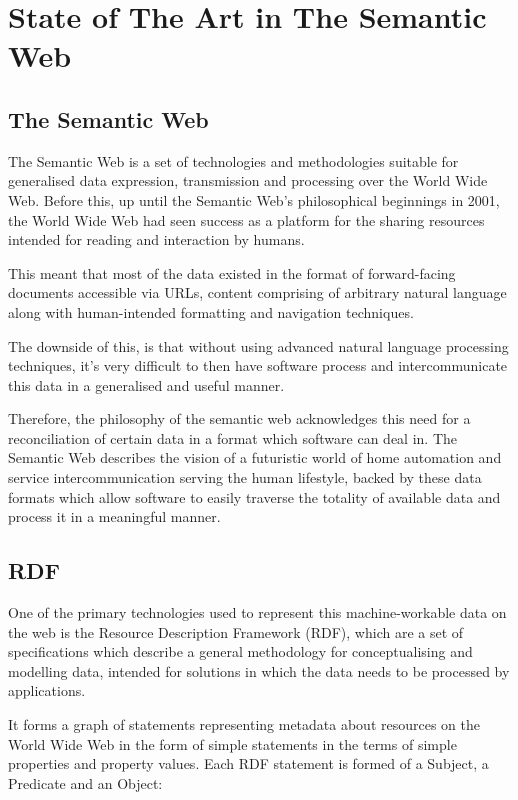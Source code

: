 \documentclass{article}
\begin{document}
\section{State of The Art in The Semantic Web}

\subsection{The Semantic Web}

The Semantic Web is a set of technologies and methodologies suitable for
generalised data expression, transmission and processing over the World Wide
Web. Before this, up until the Semantic Web's philosophical beginnings in
2001, the World Wide Web had seen success as a platform for the
sharing resources intended for reading and interaction by humans.

This meant that most of the data existed in the format of forward-facing 
documents accessible via URLs, content comprising of arbitrary natural language
along with human-intended formatting and navigation techniques.

The downside of this, is that without using advanced natural language 
processing techniques, it's very difficult to then have software process and
intercommunicate this data in a generalised and useful manner.

Therefore, the philosophy of the semantic web acknowledges this need for a
reconciliation of certain data in a format which software can deal in. The
Semantic Web\cite{semweb} describes the vision of a futuristic world of home
automation and service intercommunication serving the human lifestyle, backed by
these data formats which allow software to easily traverse the totality of
available data and process it in a meaningful manner. 

\subsection{RDF}

One of the primary technologies used to represent this machine-workable data on
the web is the Resource Description Framework (RDF), which are a set of
specifications which describe a general methodology for conceptualising and
modelling data, intended for solutions in which the data needs to be processed
by applications.

It forms a graph of statements representing metadata about resources on the
World Wide Web in the form of simple statements in the terms of simple
properties and property values. Each RDF statement is formed of a Subject, a
Predicate and an Object:
\end{document}
